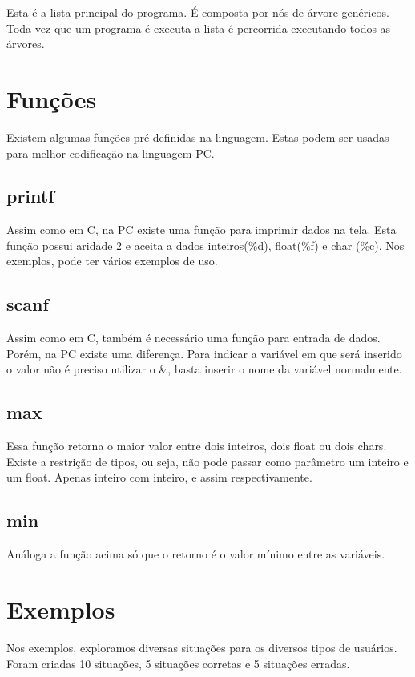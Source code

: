 \documentclass[a4paper,10pt]{article}
\begin{document}
Esta é a lista principal do programa. É composta por nós de árvore genéricos. Toda vez que um programa é executa a lista é percorrida executando todos as árvores.

\section{Funções}
Existem algumas funções pré-definidas na linguagem. Estas podem ser usadas para melhor codificação na linguagem PC.
\subsection{printf}
Assim como em C, na PC existe uma função para imprimir dados na tela. Esta função possui aridade 2 e aceita a dados inteiros(\%d), float(\%f) e char (\%c). Nos exemplos,
pode ter vários exemplos de uso.
\subsection{scanf}
Assim como em C, também é necessário uma função para entrada de dados. Porém, na PC existe uma diferença. Para indicar a variável em que será inserido o valor não é preciso 
utilizar o \&, basta inserir o nome da variável normalmente.
\subsection{max}
Essa função retorna o maior valor entre dois inteiros, dois float ou dois chars. Existe a restrição de tipos, ou seja, não pode passar como parâmetro um inteiro e um float. Apenas inteiro com inteiro, e assim respectivamente.
\subsection{min}
Análoga a função acima só que o retorno é o valor mínimo entre as variáveis.
\section{Exemplos}
Nos exemplos, exploramos diversas situações para os diversos tipos de usuários. Foram criadas 10 situações, 5 situações corretas e 5 
situações erradas.
\end{document}
